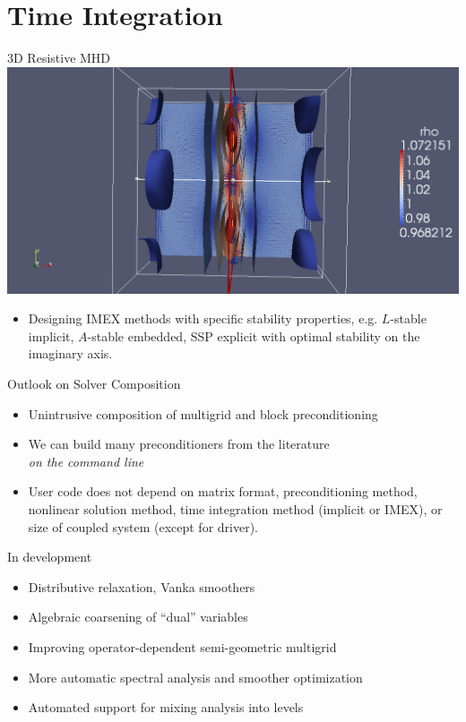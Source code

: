\documentclass{beamer}
\begin{document}


\section{Time Integration}



\begin{frame}{3D Resistive MHD}
  \includegraphics[width=\textwidth]{figures/MHD.png}
  \begin{itemize}
  \item Designing IMEX methods with specific stability properties, e.g. $L$-stable implicit, $A$-stable embedded, SSP explicit with optimal stability on the imaginary axis.
  \end{itemize}
\end{frame}

\begin{frame}{Outlook on Solver Composition}
  \begin{itemize}
  \item Unintrusive composition of multigrid and block preconditioning
  \item We can build many preconditioners from the literature \\
    \emph{on the command line}
  \item User code does not depend on matrix format, preconditioning method, nonlinear solution method, time integration method (implicit or IMEX), or size of coupled system (except for driver).
  \end{itemize}
  \begin{block}{In development}
    \begin{itemize}
    \item Distributive relaxation, Vanka smoothers
    \item Algebraic coarsening of ``dual'' variables
    \item Improving operator-dependent semi-geometric multigrid
    \item More automatic spectral analysis and smoother optimization
    \item Automated support for mixing analysis into levels
  \end{itemize}
\end{block}
\end{frame}
\end{document}
